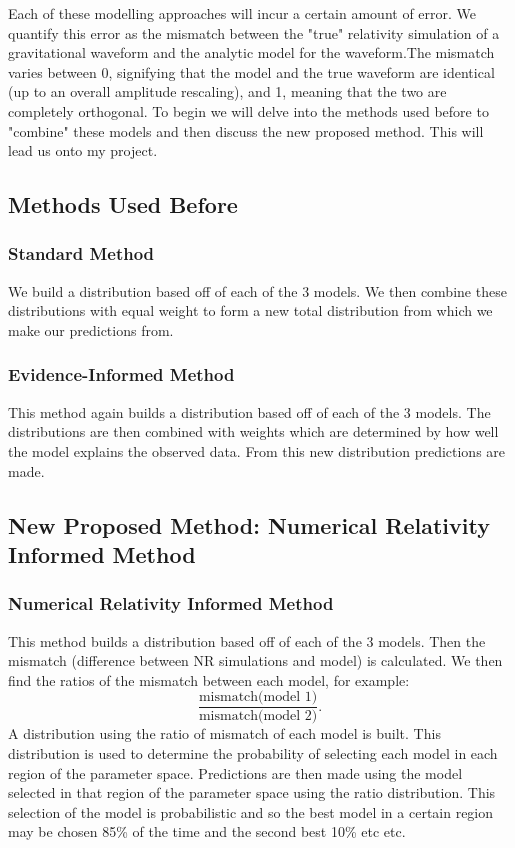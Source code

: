 \documentclass{article}
\begin{document}
\par
\noindent
Each of these modelling approaches will incur a certain amount of error. We quantify this error as the mismatch between the "true" relativity simulation of a gravitational waveform and the analytic model for the waveform.The mismatch \cite{mismatch} varies between 0, signifying that the model and the true waveform are identical (up to an overall amplitude rescaling), and 1, meaning that the two are completely orthogonal. To begin we will delve into the methods used before to "combine" these models and then discuss the new proposed method. This will lead us onto my project.



\subsection*{Methods Used Before}

\subsubsection*{Standard Method}
We build a distribution based off of each of the 3 models. We then combine these distributions with equal weight to form a new total distribution from which we make our predictions from.

\subsubsection*{Evidence-Informed Method}
This method again builds a distribution based off of each of the 3 models. The distributions are then combined with weights which are determined by how well the model explains the observed data. From this new distribution predictions are made.

\subsection*{New Proposed Method: Numerical Relativity Informed Method }%

\subsubsection*{Numerical Relativity Informed Method}
This method builds a distribution based off of each of the 3 models. Then the mismatch (difference between NR simulations and model) is calculated. We then find the ratios of the mismatch between each model, for example:
\[
\frac{\text{mismatch(model 1)}}{\text{mismatch(model 2)}}.
\]
A distribution using the ratio of mismatch of each model is built. This distribution is used to determine the probability of selecting each model in each region of the parameter space. Predictions are then made using the model selected in that region of the parameter space using the ratio distribution. This selection of the model is probabilistic and so the best model in a certain region may be chosen 85\% of the time and the second best 10\% etc etc.
\end{document}
